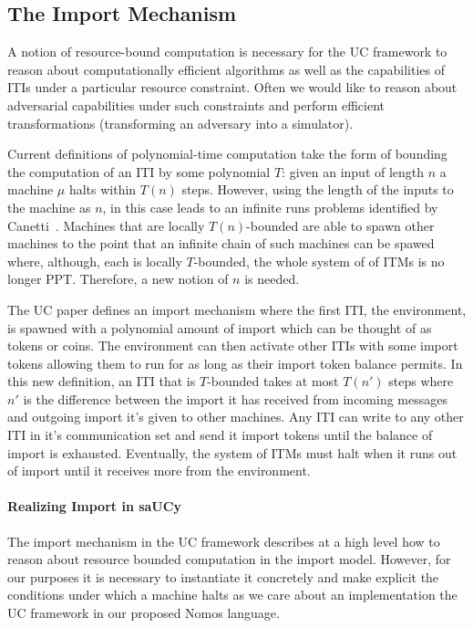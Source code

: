 \subsection{The Import Mechanism}
A notion of resource-bound computation is necessary for the UC framework to reason about computationally efficient algorithms as well as the capabilities of ITIs under a particular resource constraint.
Often we would like to reason about adversarial capabilities under such constraints and perform efficient transformations (transforming an adversary into a simulator).

Current definitions of polynomial-time computation take the form of bounding the computation of an ITI by some polynomial $T$:
given an input of length $n$ a machine $\mu$ halts within $T(n)$ steps.
However, using the length of the inputs to the machine as $n$, in this case leads to an infinite runs problems identified by Canetti~\cite{uc}.
Machines that are locally $T(n)$-bounded are able to spawn other machines to the point that an infinite chain of such machines can be spawed where, although, each is locally $T$-bounded, the whole system of of ITMs is no longer PPT. 
Therefore, a new notion of $n$ is needed. 

The UC paper defines an import mechanism where the first ITI, the environment, is spawned with a polynomial amount of import which can be thought of as tokens or coins.
The environment can then activate other ITIs with some import tokens allowing them to run for as long as their import token balance permits. 
In this new definition, an ITI that is $T$-bounded takes at most $T(n')$ steps where $n'$ is the difference between the import it has received from incoming messages and outgoing import it's given to other machines.
Any ITI can write to any other ITI in it's communication set and send it import tokens until the balance of import is exhausted.
Eventually, the system of ITMs must halt when it runs out of import until it receives more from the environment.

\paragraph{Realizing Import in saUCy} \label{sec:realizeimport}
The import mechanism in the UC framework describes at a high level how to reason about resource bounded computation in the import model.
However, for our purposes it is necessary to instantiate it concretely and make explicit the conditions under which a machine halts as we care about an implementation the UC framework in our proposed Nomos language. 

